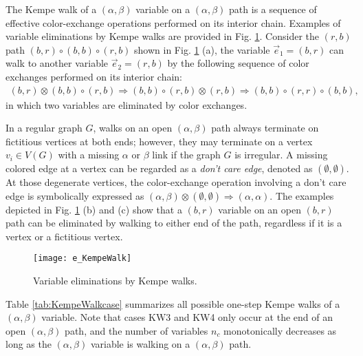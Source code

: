 \documentclass[11pt]{article}
\begin{document}
The Kempe walk of a $(\alpha,\beta)$ variable on a $(\alpha,\beta)$ path is a sequence of effective color-exchange operations performed on its interior chain. Examples of variable eliminations by Kempe walks are provided in Fig. \ref{fig:KempeWalk}. Consider the $(r,b)$ path $(b,r)\circ (b,b) \circ(r,b)$ shown in Fig. \ref{fig:KempeWalk} (a), the variable $\vec{e}_1=(b,r)$ can walk to another variable $\vec{e}_2=(r,b)$ by the following sequence of color exchanges performed on its interior chain:
\begin{align}
 (b,r) \otimes  (b,b) \circ (r,b) \Rightarrow (b,b)\circ (r,b) \otimes (r,b) \Rightarrow (b,b)\circ (r,r) \circ (b,b), \nonumber
\end{align}
in which two variables are eliminated by color exchanges.

In a regular graph $G$, walks on an open $(\alpha,\beta)$ path always terminate on fictitious vertices at both ends; however, they may terminate on a vertex $v_i\in V(G)$ with a missing $\alpha$ or $\beta$ link if the graph $G$ is irregular. A missing colored edge at a vertex can be regarded as a {\it don't care edge}, denoted as $(\emptyset,\emptyset)$. At those degenerate vertices, the color-exchange operation involving a don't care edge is symbolically expressed as $(\alpha,\beta) \otimes (\emptyset,\emptyset) \Rightarrow (\alpha,\alpha)$. The examples depicted in Fig. \ref{fig:KempeWalk} (b) and (c) show that a $(b,r)$ variable on an open $(b,r)$ path can be eliminated by walking to either end of the path, regardless if it is a vertex or a fictitious vertex.

\begin{figure}[t]
	\centering
	\texttt{[image: e\_KempeWalk]}
	\caption{Variable eliminations by Kempe walks.}
	\label{fig:KempeWalk}
\end{figure}

Table \ref{tab:KempeWalkcase} summarizes all possible one-step Kempe walks of a $(\alpha,\beta)$ variable. Note that cases KW3 and KW4 only occur at the end of an open $(\alpha,\beta)$ path, and the number of variables $n_c$ monotonically decreases as long as the $(\alpha,\beta)$ variable is walking on a $(\alpha,\beta)$ path.
\end{document}
